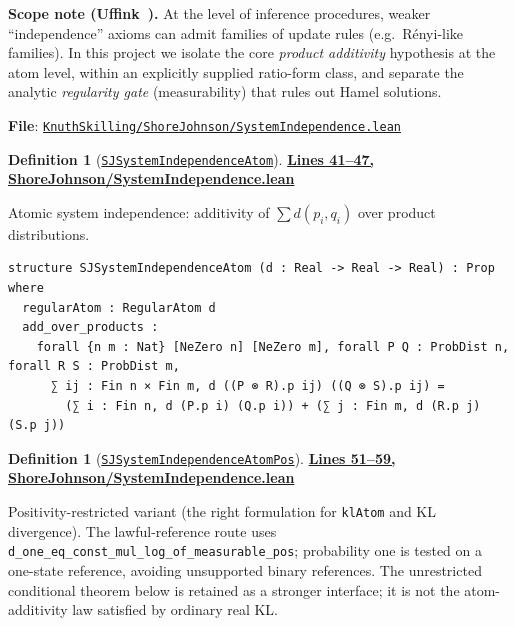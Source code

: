 \documentclass[11pt]{article}
\theoremstyle{definition}
\newtheorem{definition}[theorem]{Definition}
\theoremstyle{remark}
\begin{document}
\textbf{Scope note (Uffink~\cite{Uffink1995}).}
At the level of inference procedures, weaker ``independence'' axioms can admit families of update rules
(e.g.\ R\'enyi-like families).  In this project we isolate the core \emph{product additivity} hypothesis at the
atom level, within an explicitly supplied ratio-form class, and separate the analytic \emph{regularity gate} (measurability) that rules out Hamel solutions.

\textbf{File}: \href{https://github.com/zariuq/ks-foundations-of-inference/blob/main/KnuthSkilling/ShoreJohnson/SystemIndependence.lean}{\texttt{KnuthSkilling/ShoreJohnson/SystemIndependence.lean}}

\begin{definition}[\href{https://github.com/zariuq/ks-foundations-of-inference/blob/main/KnuthSkilling/ShoreJohnson/SystemIndependence.lean\#L41}{\texttt{SJSystemIndependenceAtom}}]
\textbf{\href{https://github.com/zariuq/ks-foundations-of-inference/blob/main/KnuthSkilling/ShoreJohnson/SystemIndependence.lean\#L41-L47}{Lines 41--47, ShoreJohnson/SystemIndependence.lean}}

Atomic system independence: additivity of $\sum d(p_i,q_i)$ over product distributions.
\end{definition}

\begin{lstlisting}[caption={Shore--Johnson system independence (atom level)}]
structure SJSystemIndependenceAtom (d : Real -> Real -> Real) : Prop where
  regularAtom : RegularAtom d
  add_over_products :
    forall {n m : Nat} [NeZero n] [NeZero m], forall P Q : ProbDist n, forall R S : ProbDist m,
      ∑ ij : Fin n × Fin m, d ((P ⊗ R).p ij) ((Q ⊗ S).p ij) =
        (∑ i : Fin n, d (P.p i) (Q.p i)) + (∑ j : Fin m, d (R.p j) (S.p j))
\end{lstlisting}

\begin{definition}[\href{https://github.com/zariuq/ks-foundations-of-inference/blob/main/KnuthSkilling/ShoreJohnson/SystemIndependence.lean\#L51}{\texttt{SJSystemIndependenceAtomPos}}]
\textbf{\href{https://github.com/zariuq/ks-foundations-of-inference/blob/main/KnuthSkilling/ShoreJohnson/SystemIndependence.lean\#L51-L59}{Lines 51--59, ShoreJohnson/SystemIndependence.lean}}

Positivity-restricted variant (the right formulation for \texttt{klAtom} and KL divergence).
The lawful-reference route uses
\texttt{d\_one\_eq\_const\_mul\_log\_of\_measurable\_pos}; probability one is tested
on a one-state reference, avoiding unsupported binary references.
The unrestricted conditional theorem below is retained as a stronger interface;
it is not the atom-additivity law satisfied by ordinary real KL.
\end{definition}
\end{document}
